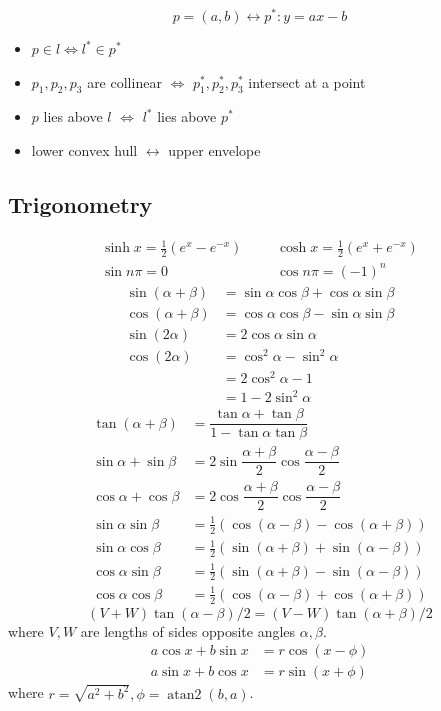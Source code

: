 \[ p=(a,b) \leftrightarrow p^*: y=ax-b \]

\begin{itemize}
    \item $p \in l \iff l^* \in p^*$
    \item $p_1, p_2, p_3$ are collinear $\iff$ $p_1^*, p_2^*, p_3^*$ intersect at a point
    \item $p$ lies above $l$ $\iff$ $l^*$ lies above $p^*$
    \item lower convex hull $\leftrightarrow$ upper envelope
\end{itemize}

\subsection{Trigonometry}
\begin{align*}
    \sinh x = \frac{1}{2}(e^x - e^{-x}) &&& \cosh x = \frac{1}{2}(e^x + e^{-x}) \\
    \sin n\pi = 0 &&& \cos n\pi = (-1)^n
\end{align*}
\begin{align*}
\sin(\alpha+\beta)&{}=\sin \alpha\cos \beta+\cos \alpha\sin \beta\\
\cos(\alpha+\beta)&{}=\cos \alpha\cos \beta-\sin \alpha\sin \beta\\
\sin(2\alpha) &{}=2\cos \alpha \sin \alpha \\
\cos(2\alpha) &{}=\cos^2 \alpha - \sin^2 \alpha \\
         &{}=2\cos^2 \alpha - 1 \\
         &{}=1 - 2 \sin^2 \alpha
\end{align*}
\begin{align*}
\tan(\alpha+\beta)&{}=\dfrac{\tan \alpha+\tan \beta}{1-\tan \alpha\tan \beta}\\
\sin \alpha+\sin \beta&{}=2\sin\dfrac{\alpha+\beta}{2}\cos\dfrac{\alpha-\beta}{2}\\
\cos \alpha+\cos \beta&{}=2\cos\dfrac{\alpha+\beta}{2}\cos\dfrac{\alpha-\beta}{2} \\
\sin \alpha \sin \beta&{}=\frac{1}{2}(\cos(\alpha - \beta) - \cos(\alpha + \beta)) \\
\sin \alpha \cos \beta&{}=\frac{1}{2}(\sin(\alpha + \beta) + \sin(\alpha - \beta)) \\
\cos \alpha \sin \beta&{}=\frac{1}{2}(\sin(\alpha + \beta) - \sin(\alpha - \beta)) \\
\cos \alpha \cos \beta&{}=\frac{1}{2}(\cos(\alpha - \beta) + \cos(\alpha + \beta))
\end{align*}
\[ (V+W)\tan(\alpha-\beta)/2{}=(V-W)\tan(\alpha+\beta)/2 \]
where $V, W$ are lengths of sides opposite angles $\alpha, \beta$.
\begin{align*}
	a\cos x+b\sin x&=r\cos(x-\phi)\\
	a\sin x+b\cos x&=r\sin(x+\phi)
\end{align*}
where $r=\sqrt{a^2+b^2}, \phi=\operatorname{atan2}(b,a)$.

